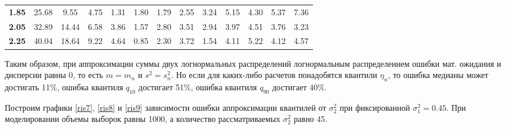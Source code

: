\documentclass[12pt]{article}
\begin{document}
\begin{table}[!hhh]
\begin{tabular}{|c|ccclcccccccc}
		\textbf{1.85}                       & 25.68                              & 9.55                               & 4.75                               & 1.31                               & 1.80                               & 1.79                               & 2.55                               & 3.24                               & 5.15                               & 4.30                               & 5.37                               & 7.36                               \\ \cline{1-1}
		\textbf{2.05}                       & 32.89                              & 14.44                              & 6.58                               & 3.86                               & 1.57                               & 2.80                               & 3.51                               & 2.94                               & 3.97                               & 4.51                               & 3.76                               & 3.23                               \\ \cline{1-1}
		\multicolumn{1}{|l|}{\textbf{2.25}} & \multicolumn{1}{l}{40.04}          & \multicolumn{1}{l}{18.64}          & \multicolumn{1}{l}{9.22}           & 4.64                               & \multicolumn{1}{l}{0.85}           & \multicolumn{1}{l}{2.30}           & \multicolumn{1}{l}{3.72}           & \multicolumn{1}{l}{1.54}           & \multicolumn{1}{l}{4.11}           & \multicolumn{1}{l}{5.22}           & \multicolumn{1}{l}{4.12}           & \multicolumn{1}{l}{4.57}           \\ \cline{1-1}
	\end{tabular}
\end{table}

Таким образом, при аппроксимации суммы двух логнормальных распределений логнормальным распределением ошибки мат. ожидания и дисперсии равны 0, то есть $m=m_{n}$ и $s^{2} = s_{n}^{2}$. Но если для каких-либо расчетов понадобятся квантили $\eta_{n}$, то ошибка медианы может достигать 11\%, ошибка  квантиля $q_{10}$ достигает 51\%, ошибка квантиля $q_{90}$ достигает 40\%.

Построим графики \ref{ris7}, \ref{ris8} и \ref{ris9} зависимости ошибки аппроксимации квантилей от $\sigma_{2}^{2}$ при фиксированной $\sigma_{1}^{2} = 0.45$. При моделировании объемы выборок равны 1000, а количество рассматриваемых $\sigma_{2}^{2}$ равно 45.
\end{document}
